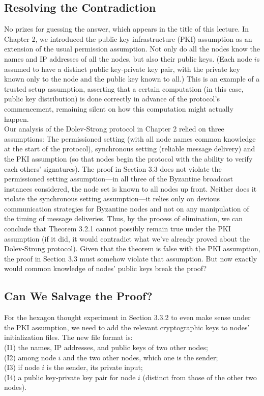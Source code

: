\subsection{Resolving the Contradiction}
No prizes for guessing the answer, which appears in the title of this lecture. In Chapter 2,
we introduced the public key infrastructure (PKI) assumption as an extension of the usual
permission assumption. Not only do all the nodes know the names and IP addresses of all the
nodes, but also their public keys. (Each node $i$s assumed to have a distinct public key-private key pair, with the private key known only to the node and the public key known to all.) This is an example of a trusted setup assumption, asserting that a certain computation (in this
case, public key distribution) is done correctly in advance of the protocol’s commencement,
remaining silent on how this computation might actually happen.\\
Our analysis of the Dolev-Strong protocol in Chapter 2 relied on three assumptions: The
permissioned setting (with all node names common knowledge at the start of the protocol),
synchronous setting (reliable message delivery) and the PKI assumption (so that nodes begin
the protocol with the ability to verify each others’ signatures). The proof in Section 3.3 does
not violate the permissioned setting assumption—in all three of the Byzantine broadcast
instances considered, the node set is known to all nodes up front. Neither does it violate
the synchronous setting assumption—it relies only on devious communication strategies for
Byzantine nodes and not on any manipulation of the timing of message deliveries. Thus, by
the process of elimination, we can conclude that Theorem 3.2.1 cannot possibly remain true
under the PKI assumption (if it did, it would contradict what we've already proved about
the Dolev-Strong protocol). Given that the theorem is false with the PKI assumption, the
proof in Section 3.3 must somehow violate that assumption. But now exactly would common
knowledge of nodes’ public keys break the proof?


\subsection{Can We Salvage the Proof?}
For the hexagon thought experiment in Section 3.3.2 to even make sense under the PKI
assumption, we need to add the relevant cryptographic keys to nodes’ initialization files.
The new file format is:\\
\noindent
(I1) the names, IP addresses, and public keys of two other nodes;\\
\noindent
(I2) among node $i$ and the two other nodes, which one is the sender;\\
\noindent
(I3) if node $i$ is the sender, its private input;\\
\noindent
(I4) a public key-private key pair for node $i$ (distinct from those of the other two nodes).\\

